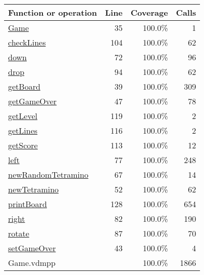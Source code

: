\begin{longtable}{|l|r|r|r|}
\hline
Function or operation & Line & Coverage & Calls \\
\hline
\hline
\hyperref[Game:35]{Game} & 35&100.0\% & 1 \\
\hline
\hyperref[checkLines:104]{checkLines} & 104&100.0\% & 62 \\
\hline
\hyperref[down:72]{down} & 72&100.0\% & 96 \\
\hline
\hyperref[drop:94]{drop} & 94&100.0\% & 62 \\
\hline
\hyperref[getBoard:39]{getBoard} & 39&100.0\% & 309 \\
\hline
\hyperref[getGameOver:47]{getGameOver} & 47&100.0\% & 78 \\
\hline
\hyperref[getLevel:119]{getLevel} & 119&100.0\% & 2 \\
\hline
\hyperref[getLines:116]{getLines} & 116&100.0\% & 2 \\
\hline
\hyperref[getScore:113]{getScore} & 113&100.0\% & 12 \\
\hline
\hyperref[left:77]{left} & 77&100.0\% & 248 \\
\hline
\hyperref[newRandomTetramino:67]{newRandomTetramino} & 67&100.0\% & 14 \\
\hline
\hyperref[newTetramino:52]{newTetramino} & 52&100.0\% & 62 \\
\hline
\hyperref[printBoard:128]{printBoard} & 128&100.0\% & 654 \\
\hline
\hyperref[right:82]{right} & 82&100.0\% & 190 \\
\hline
\hyperref[rotate:87]{rotate} & 87&100.0\% & 70 \\
\hline
\hyperref[setGameOver:43]{setGameOver} & 43&100.0\% & 4 \\
\hline
\hline
Game.vdmpp & & 100.0\% & 1866 \\
\hline
\end{longtable}

